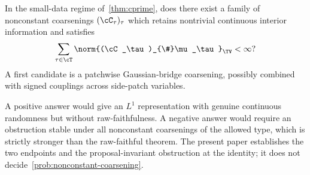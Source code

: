 \begin{problem}
\label{prob:nonconstant-coarsening}
In the small-data regime of~\cref{thm:cprime}, does there exist a family of nonconstant coarsenings $(\cC_\tau)_\tau$ which retains nontrivial continuous interior information and satisfies
\begin{equation*}
  \sum_{\tau\in\cT}
  \norm{(\cC_\tau)_{\#}\mu_\tau}_{\TV}
  <\infty?
\end{equation*}
A first candidate is a patchwise Gaussian-bridge coarsening, possibly combined with signed couplings across side-patch variables.
\end{problem}

A positive answer would give an $L^1$ representation with genuine continuous randomness but without raw-faithfulness. A negative answer would require an obstruction stable under all nonconstant coarsenings of the allowed type, which is strictly stronger than the raw-faithful theorem. The present paper establishes the two endpoints and the proposal-invariant obstruction at the identity; it does not decide~\cref{prob:nonconstant-coarsening}.
